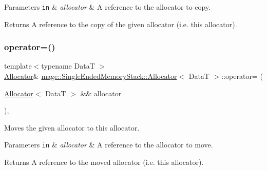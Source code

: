 \begin{DoxyParams}[1]{Parameters}
\mbox{\tt in}  & {\em allocator} & A reference to the allocator to copy. \\
\hline
\end{DoxyParams}
\begin{DoxyReturn}{Returns}
A reference to the copy of the given allocator (i.\+e. this allocator). 
\end{DoxyReturn}
\hypertarget{structmage_1_1_single_ended_memory_stack_1_1_allocator_a43cdcfdfe7ee8d8f82f542245c6fc1d5}{}\label{structmage_1_1_single_ended_memory_stack_1_1_allocator_a43cdcfdfe7ee8d8f82f542245c6fc1d5} 
\subsubsection{\texorpdfstring{operator=()}{operator=()}\hspace{0.1cm}{\footnotesize\ttfamily [2/2]}}
{\footnotesize\ttfamily template$<$typename DataT $>$ \\
\hyperlink{structmage_1_1_single_ended_memory_stack_1_1_allocator}{Allocator}\& \hyperlink{structmage_1_1_single_ended_memory_stack_1_1_allocator}{mage\+::\+Single\+Ended\+Memory\+Stack\+::\+Allocator}$<$ DataT $>$\+::operator= (\begin{DoxyParamCaption}\item[{\hyperlink{structmage_1_1_single_ended_memory_stack_1_1_allocator}{Allocator}$<$ DataT $>$ \&\&}]{allocator }\end{DoxyParamCaption})\hspace{0.3cm}{\ttfamily [default]}, {\ttfamily [noexcept]}}

Moves the given allocator to this allocator.


\begin{DoxyParams}[1]{Parameters}
\mbox{\tt in}  & {\em allocator} & A reference to the allocator to move. \\
\hline
\end{DoxyParams}
\begin{DoxyReturn}{Returns}
A reference to the moved allocator (i.\+e. this allocator). 
\end{DoxyReturn}
\hypertarget{structmage_1_1_single_ended_memory_stack_1_1_allocator_a47f5e7baf66ddebc8aec402c6a9f1eef}{}\label{structmage_1_1_single_ended_memory_stack_1_1_allocator_a47f5e7baf66ddebc8aec402c6a9f1eef} 
